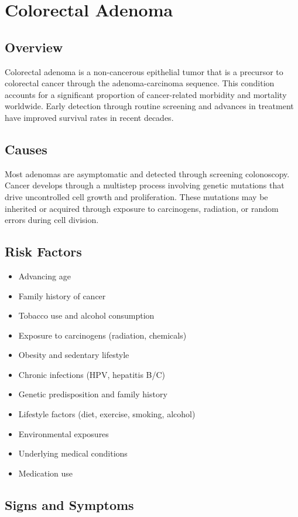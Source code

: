 \chapter{Colorectal Adenoma}
\label{sec:Colorectal Adenoma}

\section{Overview}
Colorectal adenoma is a non-cancerous epithelial tumor that is a precursor to colorectal cancer through the adenoma-carcinoma sequence. This condition accounts for a significant proportion of cancer-related morbidity and mortality worldwide. Early detection through routine screening and advances in treatment have improved survival rates in recent decades.
\section{Causes}
Most adenomas are asymptomatic and detected through screening colonoscopy. Cancer develops through a multistep process involving genetic mutations that drive uncontrolled cell growth and proliferation. These mutations may be inherited or acquired through exposure to carcinogens, radiation, or random errors during cell division.    
\section{Risk Factors}

\begin{itemize}[noitemsep]
  \item Advancing age
  \item Family history of cancer
  \item Tobacco use and alcohol consumption
  \item Exposure to carcinogens (radiation, chemicals)
  \item Obesity and sedentary lifestyle
  \item Chronic infections (HPV, hepatitis B/C)
  \item Genetic predisposition and family history
  \item Lifestyle factors (diet, exercise, smoking, alcohol)
  \item Environmental exposures
  \item Underlying medical conditions
  \item Medication use
\end{itemize}
\section{Signs and Symptoms}

